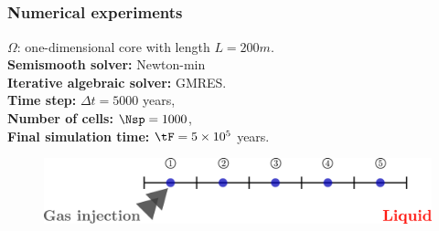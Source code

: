 \documentclass[10 pt]{beamer}
\begin{document}
\subsection{}
\begin{frame}
\frametitle{Numerical experiments}
$\Omega$:  one-dimensional core with length $L = 200 m$. 
\\
\vspace{0.2 cm}
\textbf{Semismooth solver:} Newton-min
\\
\vspace{0.2 cm}
\textbf{Iterative algebraic solver:} GMRES.
\\
\vspace{0.2 cm}
\textbf{Time step:} $\Delta t = 5000$ years, 
\\
\vspace{0.2 cm}
\textbf{Number of cells:} $\Nsp = 1000$, \\
\vspace{0.2 cm}
\textbf{Final simulation time:} $\tF = 5 \times 10^{5}$ years.
\\
\vspace{0.2 cm}
\begin{figure}
\includegraphics[width= 1 \textwidth]{image/num_exp_finite_vol}
\end{figure}


\end{frame}
\end{document}
